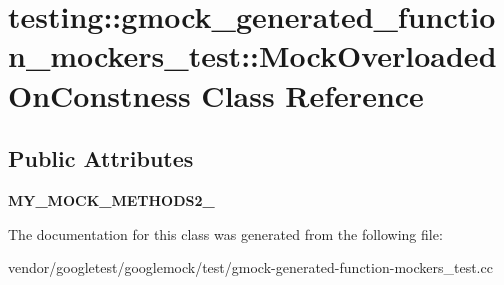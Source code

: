 \hypertarget{classtesting_1_1gmock__generated__function__mockers__test_1_1_mock_overloaded_on_constness}{}\section{testing\+:\+:gmock\+\_\+generated\+\_\+function\+\_\+mockers\+\_\+test\+:\+:Mock\+Overloaded\+On\+Constness Class Reference}
\label{classtesting_1_1gmock__generated__function__mockers__test_1_1_mock_overloaded_on_constness}
\subsection*{Public Attributes}
\begin{DoxyCompactItemize}
\item 
\mbox{\label{classtesting_1_1gmock__generated__function__mockers__test_1_1_mock_overloaded_on_constness_a3447041442c4ca64d597186e894b307d}} 
{\bfseries M\+Y\+\_\+\+M\+O\+C\+K\+\_\+\+M\+E\+T\+H\+O\+D\+S2\+\_\+}
\end{DoxyCompactItemize}


The documentation for this class was generated from the following file\+:\begin{DoxyCompactItemize}
\item 
vendor/googletest/googlemock/test/gmock-\/generated-\/function-\/mockers\+\_\+test.\+cc\end{DoxyCompactItemize}
